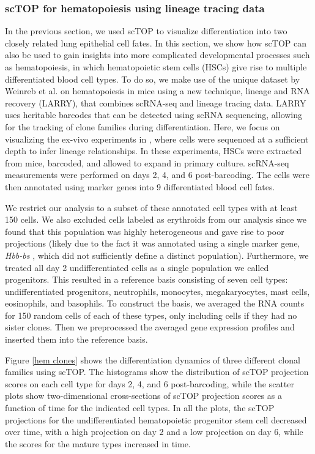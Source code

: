 \documentclass[aps,superscriptaddress, notitlepage,longbibliography]{revtex4-1}
\begin{document}
\subsubsection{scTOP for hematopoiesis using lineage tracing data}

In the previous section, we used scTOP to visualize differentiation into two closely related lung epithelial cell fates. In this section, we show how scTOP can also be used to gain insights into more complicated developmental processes such as hematopoiesis, in which hematopoietic stem cells (HSCs) give rise to multiple differentiated blood cell types. To do so, we make use of the unique dataset by Weinreb et al. \cite{weinreb_lineage_2020} on hematopoiesis in mice using a new technique, lineage and RNA recovery (LARRY), that combines scRNA-seq and lineage tracing data. LARRY uses heritable barcodes that can be detected using scRNA sequencing, allowing for the tracking of clone families during differentiation. Here, we focus on visualizing the ex-vivo experiments in \cite{weinreb_lineage_2020}, where cells were sequenced at a sufficient depth to infer lineage relationships. In these experiments, HSCs were extracted from mice, barcoded, and allowed to expand in primary culture. scRNA-seq measurements were performed on days 2, 4, and 6 post-barcoding. The cells were then annotated using marker genes into 9 differentiated blood cell fates. 

We restrict our analysis to a subset of these annotated cell types with at least 150 cells. We also excluded cells labeled as erythroids from our analysis since we found that this population was highly heterogeneous and gave rise to poor projections (likely due to the fact it was annotated using a single marker gene, \textit{Hbb-bs} \cite{weinreb_lineage_2020}, which did not sufficiently define a distinct population). Furthermore, we treated all day 2 undifferentiated cells as a single population we called progenitors. This resulted in a reference basis consisting of seven cell types: undifferentiated progenitors, neutrophils, monocytes, megakaryocytes, mast cells, eosinophils, and basophils. To construct the basis, we averaged the RNA counts for 150 random cells of each of these types, only including cells if they had no sister clones. Then we preprocessed the averaged gene expression profiles and inserted them into the reference basis.

Figure \ref{hem clones} shows the differentiation dynamics of three different clonal families using scTOP. The histograms show the distribution of scTOP projection scores on each cell type for days 2, 4, and 6 post-barcoding, while the scatter plots show two-dimensional cross-sections of scTOP projection scores as a function of time for the indicated cell types. In all the plots, the scTOP projections for the undifferentiated hematopoietic progenitor stem cell decreased over time, with a high projection on day 2 and a low projection on day 6, while the scores for the mature types increased in time. 
\end{document}
